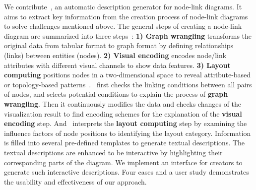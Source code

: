 


We contribute~\textit{\ApproachName}, an automatic description generator for node-link diagrams.
It aims to extract key information from the creation process of node-link diagrams to solve challenges mentioned above.
The general steps of creating a node-link diagram are summarized into three steps~\cite{DBLP:journals/cgf/SpritzerBDFF15, tvcg/RomatAP21}:
\textbf{1) Graph wrangling} transforms the original data from tabular format to graph format by defining relationships (links) between entities (nodes).
\textbf{2) Visual encoding} encodes node/link attributes with different visual channels to show data features. 
\textbf{3) Layout computing} positions nodes in a two-dimensional space to reveal attribute-based or topology-based patterns~\cite{DBLP:journals/cgf/NobreMSL19}.
\ApproachName~first checks the linking conditions between all pairs of nodes, and selects potential conditions to explain the process of \textbf{graph wrangling}.
Then it continuously modifies the data and checks changes of the visualization result to find encoding schemes for the explanation of the \textbf{visual encoding} step.
And \ApproachName~interprets the \textbf{layout computing} step by examining the influence factors of node positions to identifying the layout category.
Information is filled into several pre-defined templates to generate textual descriptions.
The textual descriptions are enhanced to be interactive by highlighting their corresponding parts of the diagram.
We implement an interface for creators to generate such interactive descriptions.
Four cases and a user study demonstrates the usability and effectiveness of our approach.


